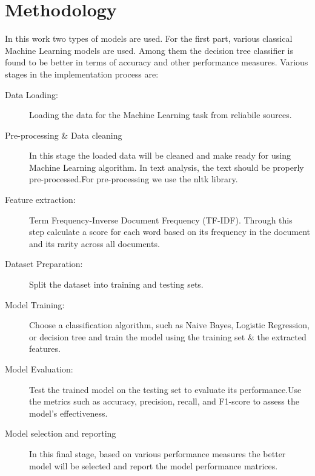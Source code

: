 \documentclass{josis}
\begin{document}
\section{Methodology}
  In this work two types of models are used. For the first part, various classical Machine Learning models are used. Among them the decision tree classifier is found to be better in terms of accuracy and other performance measures. Various stages in the implementation process are:
\begin{description}
    \item[Data Loading:] Loading the data for the Machine Learning task from reliabile sources.
    \item[Pre-processing \& Data cleaning] In this stage the loaded data will be cleaned and make ready for using Machine Learning algorithm. In text analysis, the text should be properly pre-processed.For pre-processing we use the nltk library.

    \item[Feature extraction:] Term Frequency-Inverse Document Frequency (TF-IDF). Through this step calculate a score for each word based on its frequency in the document and its rarity across all documents.
    \item[Dataset Preparation:]Split the dataset into training and testing sets.
    \item[Model Training:] Choose a classification algorithm, such as Naive Bayes, Logistic Regression, or decision tree and train the model using the training set \& the extracted features.
    \item[Model Evaluation:] Test the trained model on the testing set to evaluate its performance.Use the metrics such as accuracy, precision, recall, and F1-score to assess the model's effectiveness.
    \item[Model selection and reporting] In this final stage, based on various performance measures the better model will be selected and report the model performance matrices.
\end{description} 
\end{document}
